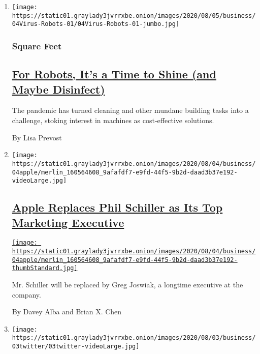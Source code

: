 \begin{enumerate}
\def\labelenumi{\arabic{enumi}.}
\item
  \texttt{[image: https://static01.graylady3jvrrxbe.onion/images/2020/08/05/business/04Virus-Robots-01/04Virus-Robots-01-jumbo.jpg]}

  \hypertarget{square-feet}{%
  \subsubsection{Square Feet}\label{square-feet}}

  \hypertarget{for-robots-its-a-time-to-shine-and-maybe-disinfect}{%
  \subsection{\texorpdfstring{\href{/2020/08/04/business/robot-cleaning-coronavirus.html}{For
  Robots, It's a Time to Shine (and Maybe
  Disinfect)}}{For Robots, It's a Time to Shine (and Maybe Disinfect)}}\label{for-robots-its-a-time-to-shine-and-maybe-disinfect}}

  The pandemic has turned cleaning and other mundane building tasks into
  a challenge, stoking interest in machines as cost-effective solutions.

  By Lisa Prevost
\item
  \texttt{[image: https://static01.graylady3jvrrxbe.onion/images/2020/08/04/business/04apple/merlin\_160564608\_9afafdf7-e9fd-44f5-9b2d-daad3b37e192-videoLarge.jpg]}

  \hypertarget{apple-replaces-phil-schiller-as-its-top-marketing-executive}{%
  \subsection{\texorpdfstring{\href{/2020/08/04/technology/apple-schiller-marketing-executive-departure.html}{Apple
  Replaces Phil Schiller as Its Top Marketing
  Executive}}{Apple Replaces Phil Schiller as Its Top Marketing Executive}}\label{apple-replaces-phil-schiller-as-its-top-marketing-executive}}

  \href{/2020/08/04/technology/apple-schiller-marketing-executive-departure.html}{\texttt{[image: https://static01.graylady3jvrrxbe.onion/images/2020/08/04/business/04apple/merlin\_160564608\_9afafdf7-e9fd-44f5-9b2d-daad3b37e192-thumbStandard.jpg]}}

  Mr. Schiller will be replaced by Greg Joswiak, a longtime executive at
  the company.

  By Davey Alba and Brian X. Chen
\item
  \texttt{[image: https://static01.graylady3jvrrxbe.onion/images/2020/08/03/business/03twitter/03twitter-videoLarge.jpg]}


\end{enumerate}
